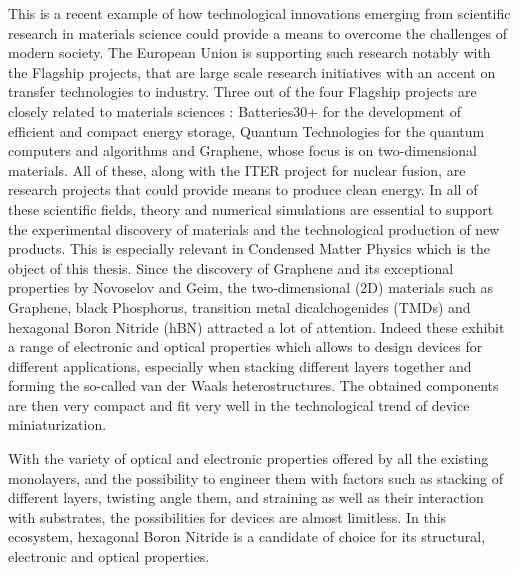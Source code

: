 This is a recent example of how technological innovations emerging from scientific research in materials science could provide a means to overcome the challenges of modern society. The European Union is supporting such research notably with the Flagship projects, that are large scale research initiatives with an accent on transfer technologies to industry. Three out of the four Flagship projects are closely related to materials sciences : Batteries30+ for the development of efficient and compact energy storage, Quantum Technologies for the quantum computers and algorithms and Graphene, whose focus is on two-dimensional materials. All of these, along with the ITER project for nuclear fusion, are research projects that could provide means to produce clean energy. In all of these scientific fields, theory and numerical simulations are essential to support the experimental discovery of materials and the technological production of new products. This is especially relevant in Condensed Matter Physics which is the object of this thesis. Since the discovery of Graphene and its exceptional properties by Novoselov and Geim,\cite{graphene} the two-dimensional (2D) materials such as Graphene, black Phosphorus, transition metal dicalchogenides (TMDs) and hexagonal Boron Nitride (hBN) attracted a lot of attention. Indeed these exhibit a range of electronic and optical properties which allows to design devices for different applications, especially when stacking different layers together and forming the so-called van der Waals heterostructures.\cite{something} The obtained components are then very compact and fit very well in the technological trend of device miniaturization.

With the variety of optical and electronic properties offered by all the existing monolayers, and the possibility to engineer them with factors such as stacking of different layers,\cite{sponza2018direct} twisting angle them,\cite{latil2023structural, impellizzeri2022electronic} and straining\cite{blundo2021strain} as well as their interaction with substrates, the possibilities for devices are almost limitless. In this ecosystem, hexagonal Boron Nitride is a candidate of choice for its structural, electronic and optical properties.

% 

